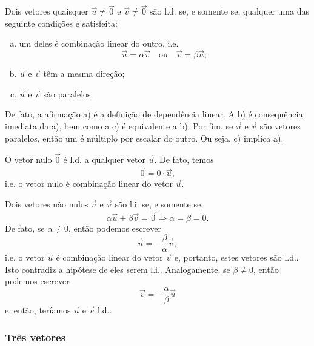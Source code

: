 Dois vetores quaisquer $\vec{u}\neq\vec{0}$ e $\vec{v}\neq\vec{0}$ são l.d. se, e somente se, qualquer uma das seguinte condições é satisfeita:
\begin{enumerate}[a)]
\item um deles é combinação linear do outro, i.e.
  \begin{equation}
    \vec{u} = \alpha\vec{v}\quad\text{ou}\quad\vec{v}=\beta\vec{u};
  \end{equation}
\item $\vec{u}$ e $\vec{v}$ têm a mesma direção;
\item $\vec{u}$ e $\vec{v}$ são paralelos.
\end{enumerate}
De fato, a afirmação a) é a definição de dependência linear. A b) é consequência imediata da a), bem como a c) é equivalente a b). Por fim, se $\vec{u}$ e $\vec{v}$ são vetores paralelos, então um é múltiplo por escalar do outro. Ou seja, c) implica a).

\begin{obs}
  O vetor nulo $\vec{0}$ é l.d. a qualquer vetor $\vec{u}$. De fato, temos
  \begin{equation}
    \vec{0} = 0\cdot\vec{u},
  \end{equation}
  i.e. o vetor nulo é combinação linear do vetor $\vec{u}$.
\end{obs}

\begin{obs}
  Dois vetores não nulos $\vec{u}$ e $\vec{v}$ são l.i. se, e somente se,
  \begin{equation}
    \alpha\vec{u} + \beta\vec{v} = \vec{0} \Rightarrow \alpha=\beta=0.
  \end{equation}
  De fato, se $\alpha\neq 0$, então podemos escrever
  \begin{equation}
    \vec{u} = -\frac{\beta}{\alpha}\vec{v},
  \end{equation}
  i.e. o vetor $\vec{u}$ é combinação linear do vetor $\vec{v}$ e, portanto, estes vetores são l.d.. Isto contradiz a hipótese de eles serem l.i.. Analogamente, se $\beta \neq 0$, então podemos escrever
  \begin{equation}
    \vec{v} = -\frac{\alpha}{\beta}\vec{u}
  \end{equation}
  e, então, teríamos $\vec{u}$ e $\vec{v}$ l.d..
\end{obs}


\subsubsection{Três vetores}

